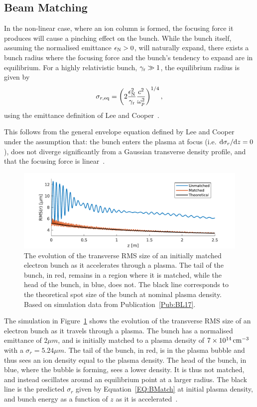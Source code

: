 \subsection{Beam Matching}
\label{Int:BPI:Match}

In the non-linear case, where an ion column is formed, the focusing force it produces will cause a pinching effect on the bunch.
While the bunch itself, assuming the normalised emittance $\epsilon_{\mathrm{N}} > 0$, will naturally expand, there exists a bunch radius where the focusing force and the bunch's tendency to expand are in equilibrium.
For a highly relativistic bunch, $\gamma_{\mathrm{r}} \gg 1$, the equilibrium radius is given by~\cite{krall:1995}
\begin{equation}
    \sigma_{r,\mathrm{eq}} = \left(2\frac{\epsilon_{\mathrm{N}}^2}{\gamma_{\mathrm{r}}} \frac{c^2}{\omega_{p}^2} \right)^{1/4}, \label{EQ:BMatch}
\end{equation}
using the emittance definition of Lee and Cooper~\cite{lee:1976}.

This follows from the general envelope equation defined by Lee and Cooper~\cite{lee:1976} under the assumption that: the bunch enters the plasma at focus (i.e. $\mathrm{d}\sigma_{r}/\mathrm{d} z = 0$), does not diverge significantly from a Gaussian transverse density profile, and that the focusing force is linear~\cite{krall:1995}.

\begin{figure}[hbt]
    \centering
    \includegraphics[width=0.875\linewidth,trim={0mm 0mm 0mm 0mm},clip]{figures/BeamMatching}
    \caption{\label{Fig:BPI:Match}
        The evolution of the transverse RMS size of an initially matched electron bunch as it accelerates through a plasma.
        The tail of the bunch, in red, remains in a region where it is matched, while the head of the bunch, in blue, does not.
        The black line corresponds to the theoretical spot size of the bunch at nominal plasma density.
        Based on simulation data from Publication~\ref{Pub:BL17}.
    }
\end{figure}

The simulation in Figure~\ref{Fig:BPI:Match} shows the evolution of the transverse RMS size of an electron bunch as it travels through a plasma.
The bunch has a normalised emittance of $2\unit{\mu m}$, and is initially matched to a plasma density of $7\times 10^{14}\,\mathrm{cm}^{-3}$ with a $\sigma_{r} = 5.24\unit{\mu m}$.
The tail of the bunch, in red, is in the plasma bubble and thus sees an ion density equal to the plasma density.
The head of the bunch, in blue, where the bubble is forming, sees a lower density.
It is thus not matched, and instead oscillates around an equilibrium point at a larger radius.
The black line is the predicted $\sigma_{r}$ given by Equation~\ref{EQ:BMatch} at initial plasma density, and bunch energy as a function of $z$ as it is accelerated~\cite{berglyd_olsen:2018}.


